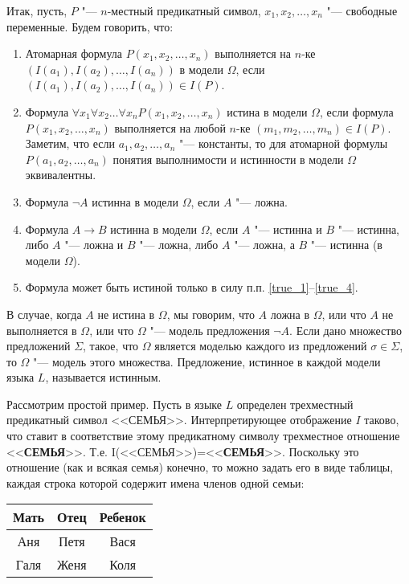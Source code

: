 \documentclass[b5paper,11pt]{book}
\begin{document}
	Итак, пусть, $P$ "--- $n$-местный предикатный символ, $x_1,x_2,\dots,x_n$ "--- свободные переменные. Будем говорить, что:
	\begin{enumerate}
		\item\label{true_1} Атомарная формула  $P(x_1,x_2,\dots,x_n)$ выполняется на $n$-ке $(I(a_1), I(a_2),\dots, I(a_n))$ в  модели $\Omega$, если $(I(a_1),I(a_2),\dots,I(a_n))\in I(P)$.
		\item Формула $\forall x_1 \forall x_2 \dots \forall x_n P(x_1,x_2,\dots,x_n)$ истина в модели $\Omega$, если формула $P(x_1,x_2,\dots,x_n)$ выполняется на любой $n$-ке $(m_1,m_2,\dots,m_n)\in I(P)$. Заметим, что если $a_1,a_2,\dots,a_n$ "--- константы, то для атомарной формулы $P(a_1,a_2,\dots,a_n)$ понятия выполнимости и истинности в модели $\Omega$ эквивалентны.
		\item Формула $\neg A$ истинна в модели $\Omega$, если $A$ "--- ложна.
		\item\label{true_4} Формула $A\rightarrow B$ истинна в модели $\Omega$, если $A$ "--- истинна и $B$ "--- истинна, либо $A$ "--- ложна и $B$ "--- ложна, либо $A$ "--- ложна, а $B$ "--- истинна (в модели $\Omega$).
		\item Формула может быть истиной только в силу п.п. \ref{true_1}--\ref{true_4}.
	\end{enumerate}
	
	В случае, когда $A$ не истина в $\Omega$, мы говорим, что $A$ ложна в $\Omega$, или что $A$ не выполняется в $\Omega$, или что $\Omega$ "--- модель предложения $\neg A$. Если дано множество предложений $\Sigma$, такое, что $\Omega$ является моделью каждого из предложений $\sigma\in\Sigma$, то $\Omega$ "--- модель этого множества. Предложение, истинное в каждой модели языка $L$, называется истинным.
	
	Рассмотрим простой пример. Пусть в языке $L$ определен трехместный предикатный символ <<СЕМЬЯ>>. Интерпретирующее отображение $I$ таково, что ставит в соответствие этому предикатному символу трехместное отношение <<\textbf{СЕМЬЯ}>>. Т.е. I(<<СЕМЬЯ>>)=<<\textbf{СЕМЬЯ}>>. Поскольку это отношение (как и всякая семья) конечно, то можно задать его в виде таблицы, каждая строка которой содержит имена членов одной семьи:
	
	\begin{table}[H]
		\centering
		\begin{tabular}{|c|c|c|}
			\hline
			\textbf{Мать} & \textbf{Отец} & \textbf{Ребенок}\\
			\hline
			Аня & Петя & Вася\\
			\hline
			Галя& Женя & Коля\\
			\hline
		\end{tabular}
	\end{table}
	
\end{document}
